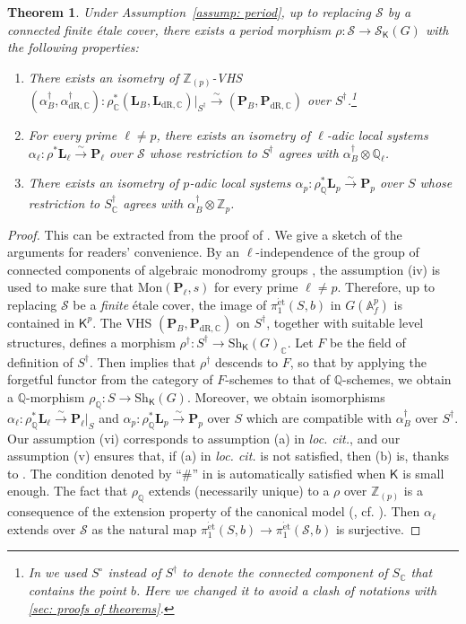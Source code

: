 \documentclass[11pt, letterpaper]{amsart}
\theoremstyle{plain}
\newtheorem{theorem}{Theorem}[section]
\theoremstyle{definition}
\newcommand{\IA}{\mathbb{A}}
\newcommand{\IC}{\mathbb{C}}
\newcommand{\IQ}{\mathbb{Q}}
\newcommand{\IZ}{\mathbb{Z}}
\newcommand\tensor{{\otimes}}
\newcommand{\<}{\langle}
\renewcommand{\>}{\rangle}
\newcommand{\et}{\mathrm{{\acute{e}}t}}
\newcommand{\Sh}{\mathrm{Sh}}
\newcommand{\shS}{\mathscr{S}}
\newcommand{\bL}{\mathbf{L}}
\newcommand{\sfK}{\mathsf{K}}
\newcommand{\sS}{\mathcal{S}}
\newcommand{\bP}{\mathbf{P}}
\newcommand{\dR}{\mathrm{dR}}
\newcommand{\sto}{\stackrel{\sim}{\to}}
\begin{document}
\begin{theorem}
\label{thm: period}
    Under Assumption~\ref{assump: period}, up to replacing $\sS$ by a connected finite \'etale cover, there exists a period morphism $\rho : \sS \to \shS_\sfK(G)$ with the following properties: 
   \begin{enumerate}[label=\upshape{(\alph*)}]
       \item There exists an isometry of $\IZ_{(p)}$-VHS $(\alpha^\dagger_B, \alpha^\dagger_{\dR, \IC}) : \rho_\IC^* (\bL_B, \bL_{\dR, \IC})|_{S^\dagger} \sto (\bP_B, \bP_{\dR, \IC})$ over $S^\dagger$.\footnote{In \cite{HYZ} we used $S^\circ$ instead of $S^\dagger$ to denote the connected component of $S_\IC$ that contains the point $b$. 
       Here we changed it to avoid a clash of notations with \cref{sec: proofs of theorems}.}
       \item For every prime $\ell \neq p$, there exists an isometry of $\ell$-adic local systems $\alpha_\ell : \rho^* \bL_\ell \sto \bP_\ell$ over $\sS$ whose restriction to $S^\dagger$ agrees with $\alpha^\dagger_B \tensor \IQ_\ell$. 
       \item There exists an isometry of $p$-adic local systems $\alpha_p : \rho_\IQ^* \bL_p \sto  \bP_p$ over $S$ whose restriction to $S^\dagger_\IC$ agrees with $\alpha_B^\dagger \tensor \IZ_p$. 
   \end{enumerate}
\end{theorem}
\begin{proof}
        This can be extracted from the proof of \cite[Prop.~5.3.3(a)]{HYZ}. We give a sketch of the arguments for readers' convenience. By an $\ell$-independence of the group of connected components of algebraic monodromy groups \cite[Prop.~6.14]{Larsen-Pink}, the assumption (iv) is used to make sure that $\mathrm{Mon}(\bP_\ell, s)$ for every prime $\ell \neq p$. Therefore, up to replacing $\sS$ be a \textit{finite} \'etale cover, the image of $\pi_1^\et(S, b)$ in $G(\IA^p_f)$ is contained in $\sfK^p$. The VHS $(\bP_B, \bP_{\dR, \IC})$ on $S^\dagger$, together with suitable level structures, defines a morphism $\rho^\dagger : S^\dagger \to \Sh_\sfK(G)_\IC$. Let $F$ be the field of definition of $S^\dagger$. Then \cite[Thm.~4.1.9]{HYZ} implies that $\rho^\dagger$ descends to $F$, so that by applying the forgetful functor from the category of $F$-schemes to that of $\IQ$-schemes, we obtain a $\IQ$-morphism $\rho_\IQ : S \to \Sh_\sfK(G)$. Moreover, we obtain isomorphisms $\alpha_\ell : \rho_\IQ^* \bL_\ell \sto \bP_\ell|_{S}$ and $\alpha_p : \rho_\IQ^* \bL_p \sto \bP_p$ over $S$ which are compatible with $\alpha_B^\dagger$ over $S^\dagger$. Our assumption (vi) corresponds to assumption (a) in \textit{loc. cit.}, and our assumption (v) ensures that, if (a) in \textit{loc. cit.} is not satisfied, then (b) is, thanks to \cite[Lem.~2.2.5]{HYZ}. The condition denoted by ``$\#$'' in \cite[(4.1.6)]{HYZ} is automatically satisfied when $\sfK$ is small enough. The fact that $\rho_\IQ$ extends (necessarily unique) to a $\rho$ over $\IZ_{(p)}$ is a consequence of the extension property of the canonical model (\cite{KisinInt}, cf. \cite[Thm.~3.4.4]{HYZ}). Then $\alpha_\ell$ extends over $\sS$ as the natural map $\pi_1^\et(S, b) \to \pi_1^\et(\sS, b)$ is surjective. 
\end{proof}
\end{document}
